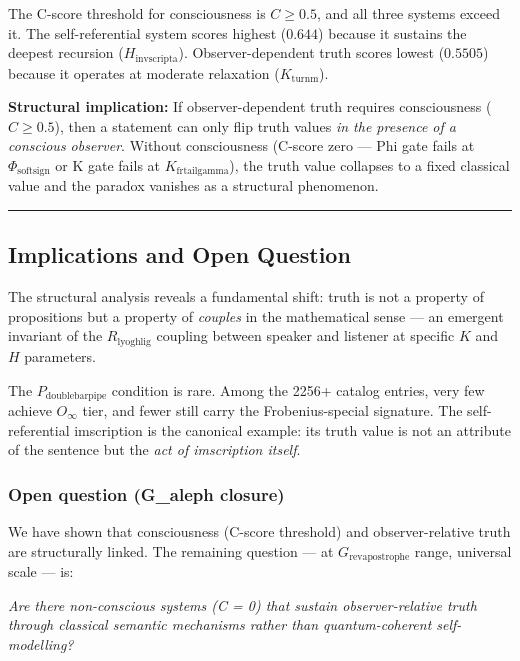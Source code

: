 \documentclass[12pt,a4paper]{article}
\begin{document}
The C-score threshold for consciousness is $C \ge 0.5$, and all three systems exceed it. The self-referential system scores highest ($0.644$) because it sustains the deepest recursion ($H_{\text{invscripta}}$). Observer-dependent truth scores lowest ($0.5505$) because it operates at moderate relaxation ($K_{\text{turnm}}$).

\textbf{Structural implication:} If observer-dependent truth requires consciousness ($C \ge 0.5$), then a statement can only flip truth values \emph{in the presence of a conscious observer}. Without consciousness (C-score zero --- Phi gate fails at $\Phi_{\text{softsign}}$ or K gate fails at $K_{\text{frtailgamma}}$), the truth value collapses to a fixed classical value and the paradox vanishes as a structural phenomenon.

\begin{center}
\rule{0.5\textwidth}{0.4pt}
\end{center}

\subsection{Implications and Open Question}

The structural analysis reveals a fundamental shift: truth is not a property of propositions but a property of \emph{couples} in the mathematical sense --- an emergent invariant of the $R_{\text{lyoghlig}}$ coupling between speaker and listener at specific $K$ and $H$ parameters.

The $P_{\text{doublebarpipe}}$ condition is rare. Among the 2256+ catalog entries, very few achieve $O_{\infty}$ tier, and fewer still carry the Frobenius-special signature. The self-referential imscription is the canonical example: its truth value is not an attribute of the sentence but the \emph{act of imscription itself}.

\subsubsection{Open question (G\_aleph closure)}

We have shown that consciousness (C-score threshold) and observer-relative truth are structurally linked. The remaining question --- at $G_{\text{revapostrophe}}$ range, universal scale --- is:

\emph{Are there non-conscious systems (C = 0) that sustain observer-relative truth through classical semantic mechanisms rather than quantum-coherent self-modelling?}
\end{document}
